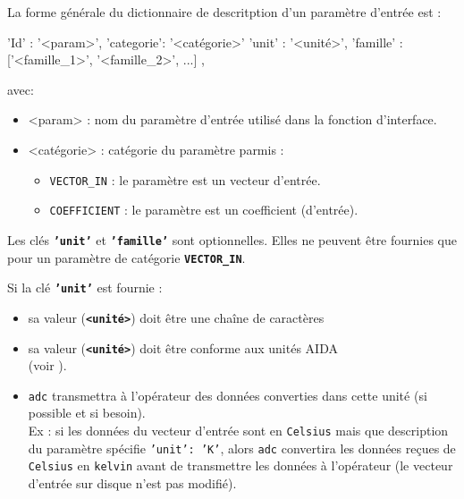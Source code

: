 La forme générale du dictionnaire de descritption d'un paramètre d'entrée est :
  \medbreak

  \begin{boxedverbatim}
    {'Id'       : '<param>',
     'categorie': '<catégorie>'
     'unit'     : '<unité>',
     'famille'  : ['<famille_1>', '<famille_2>', ...]
    },
  \end{boxedverbatim}
  \medbreak

  avec:
  \begin{itemize}
    \item[•] <param> : nom du paramètre d'entrée utilisé dans la fonction
             d'interface.
    \item[•] <catégorie> : catégorie du paramètre parmis :
      \begin{itemize}
      \item \texttt{VECTOR\_IN}  : le paramètre est un vecteur d'entrée.
      \item \texttt{COEFFICIENT} : le paramètre est un coefficient (d'entrée).
      \end{itemize}
  \end{itemize}
  \medbreak

  Les clés \textbf{\texttt{'unit'}} et \textbf{\texttt{'famille'}} sont
  optionnelles. Elles ne peuvent être fournies que pour un paramètre de
  catégorie \textbf{\texttt{VECTOR\_IN}}.
  \medbreak

  Si la clé \textbf{\texttt{'unit'}} est fournie :
  \begin{itemize}
    \item[•] sa valeur (\textbf{\texttt{<unité>}}) doit être une chaîne de
             caractères
    \item[•] sa valeur (\textbf{\texttt{<unité>}}) doit être conforme aux
             unités AIDA \\
             (voir ).
    \item[•] \texttt{adc} transmettra à l'opérateur des données converties
             dans cette unité (si possible et si besoin). \\
             Ex : si les données du vecteur d'entrée sont en \texttt{Celsius}
             mais que description du paramètre spécifie \texttt{'unit': 'K'},
             alors \texttt{adc} convertira les données reçues de
             \texttt{Celsius} en \texttt{kelvin} avant de transmettre les
             données à l'opérateur (le vecteur d'entrée sur disque n'est pas
             modifié).
  \end{itemize}
  \medbreak

